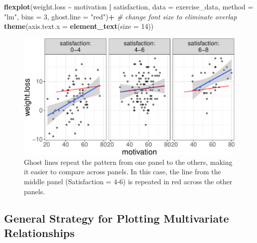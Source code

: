 \documentclass[
  man]{apa6}
\newenvironment{Shaded}{\begin{snugshade}}{\end{snugshade}}
\newcommand{\CommentTok}[1]{\textcolor[rgb]{0.56,0.35,0.01}{\textit{#1}}}
\newcommand{\DataTypeTok}[1]{\textcolor[rgb]{0.13,0.29,0.53}{#1}}
\newcommand{\DecValTok}[1]{\textcolor[rgb]{0.00,0.00,0.81}{#1}}
\newcommand{\KeywordTok}[1]{\textcolor[rgb]{0.13,0.29,0.53}{\textbf{#1}}}
\newcommand{\NormalTok}[1]{#1}
\newcommand{\OperatorTok}[1]{\textcolor[rgb]{0.81,0.36,0.00}{\textbf{#1}}}
\newcommand{\StringTok}[1]{\textcolor[rgb]{0.31,0.60,0.02}{#1}}
\begin{document}
\small

\begin{Shaded}
\begin{Highlighting}[]
\KeywordTok{flexplot}\NormalTok{(weight.loss }\OperatorTok{\textasciitilde{}}\StringTok{ }\NormalTok{motivation }\OperatorTok{|}\StringTok{ }\NormalTok{satisfaction, }
             \DataTypeTok{data =}\NormalTok{ exercise\_data, }\DataTypeTok{method =} \StringTok{"lm"}\NormalTok{, }
             \DataTypeTok{bins =} \DecValTok{3}\NormalTok{, }\DataTypeTok{ghost.line =} \StringTok{"red"}\NormalTok{)}\OperatorTok{+}
\StringTok{  }\CommentTok{\# change font size to eliminate overlap}
\StringTok{    }\KeywordTok{theme}\NormalTok{(}\DataTypeTok{axis.text.x =} 
            \KeywordTok{element\_text}\NormalTok{(}\DataTypeTok{size =} \DecValTok{14}\NormalTok{))}
\end{Highlighting}
\end{Shaded}

\begin{figure}

{\centering \includegraphics[width=0.8\linewidth]{flexplot_psychmeth_files/figure-latex/ghost-1} 

}

\caption{Ghost lines repeat the pattern from one panel to the others, making it easier to compare across panels. In this case, the line from the middle panel (Satisfaction = 4-6) is repeated in red across the other panels. \label{fig:ghost}}\label{fig:ghost}
\end{figure}

\normalsize

\hypertarget{general-strategy-for-plotting-multivariate-relationships}{%
\subsection{General Strategy for Plotting Multivariate Relationships}\label{general-strategy-for-plotting-multivariate-relationships}}
\end{document}
